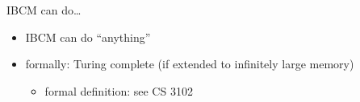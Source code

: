 \begin{frame}{IBCM can do\ldots}
\begin{itemize}
\item IBCM can do ``anything''
\item formally: Turing complete (if extended to infinitely large memory)
    \begin{itemize}
    \item formal definition: see CS 3102
    \end{itemize}
\end{itemize}
\end{frame}
